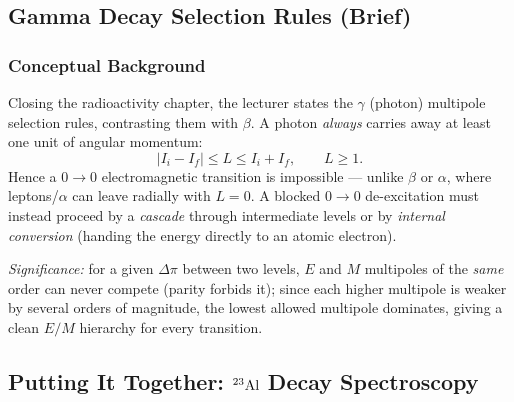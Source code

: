 \subsection{Gamma Decay Selection Rules (Brief)}
\label{subsec:lec09:gamma}

\subsubsection*{Conceptual Background}
Closing the radioactivity chapter, the lecturer states the $\gamma$ (photon)
multipole selection rules, contrasting them with $\beta$. A photon \emph{always}
carries away at least one unit of angular momentum:
\begin{equation}
  \label{eq:lec09:gamma_L}
  \boxed{|I_i - I_f| \le L \le I_i + I_f, \qquad L \ge 1.}
\end{equation}
Hence a $0\to0$ electromagnetic transition is impossible --- unlike $\beta$ or
$\alpha$, where leptons/$\alpha$ can leave radially with $L=0$. A blocked
$0\to0$ de-excitation must instead proceed by a \emph{cascade} through
intermediate levels or by \emph{internal conversion} (handing the energy directly
to an atomic electron).

\textit{Significance:} for a given $\Delta\pi$ between two levels, $E$ and $M$
multipoles of the \emph{same} order can never compete (parity forbids it); since
each higher multipole is weaker by several orders of magnitude, the lowest
allowed multipole dominates, giving a clean $E/M$ hierarchy for every transition.

\subsection{Putting It Together: \texorpdfstring{$\nucleus{Al}{23}$}{Al-23} Decay Spectroscopy}
\label{subsec:lec09:al23}


